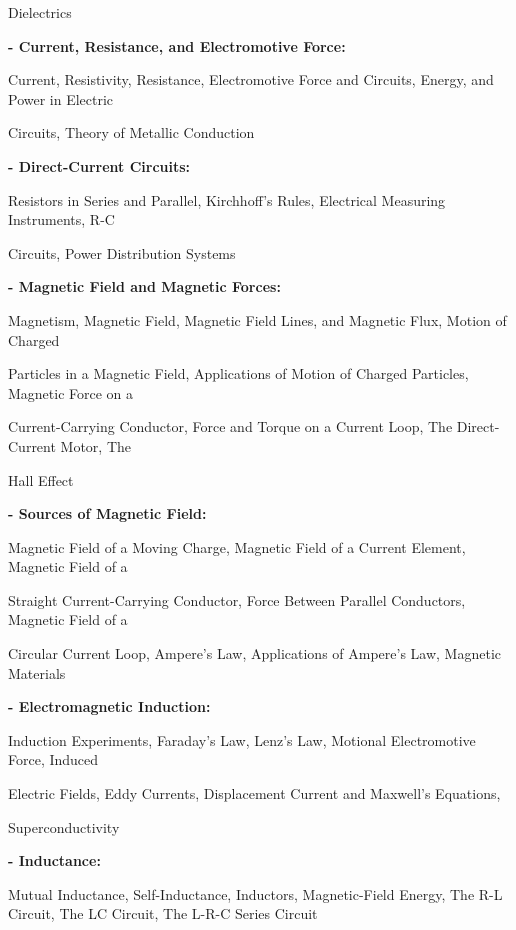 \documentclass[12pt,a4paper]{article}
\begin{document}
Dielectrics\par
\vspace{2pt}\textbf{- Current, Resistance, and Electromotive Force:}\par
Current, Resistivity, Resistance, Electromotive Force and Circuits, Energy, and Power in Electric\par
Circuits, Theory of Metallic Conduction\par
\vspace{2pt}\textbf{- Direct-Current Circuits:}\par
Resistors in Series and Parallel, Kirchhoff’s Rules, Electrical Measuring Instruments, R-C\par
Circuits, Power Distribution Systems\par
\vspace{2pt}\textbf{- Magnetic Field and Magnetic Forces:}\par
Magnetism, Magnetic Field, Magnetic Field Lines, and Magnetic Flux, Motion of Charged\par
Particles in a Magnetic Field, Applications of Motion of Charged Particles, Magnetic Force on a\par
Current-Carrying Conductor, Force and Torque on a Current Loop, The Direct-Current Motor, The\par
Hall Effect\par
\vspace{2pt}\textbf{- Sources of Magnetic Field:}\par
Magnetic Field of a Moving Charge, Magnetic Field of a Current Element, Magnetic Field of a\par
Straight Current-Carrying Conductor, Force Between Parallel Conductors, Magnetic Field of a\par
Circular Current Loop, Ampere’s Law, Applications of Ampere’s Law, Magnetic Materials\par
\vspace{2pt}\textbf{- Electromagnetic Induction:}\par
Induction Experiments, Faraday’s Law, Lenz’s Law, Motional Electromotive Force, Induced\par
Electric Fields, Eddy Currents, Displacement Current and Maxwell’s Equations,\par
Superconductivity\par
\vspace{2pt}\textbf{- Inductance:}\par
Mutual Inductance, Self-Inductance, Inductors, Magnetic-Field Energy, The R-L Circuit, The LC Circuit, The L-R-C Series Circuit\par
\end{document}
